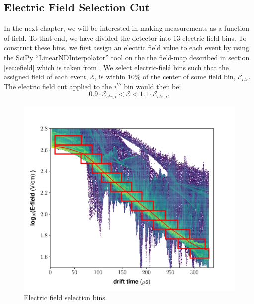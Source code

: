 {\subsection{Electric Field Selection Cut}\label{sec:fieldbins}
In the next chapter, we will be interested in making measurements as a function of field. To that end, we have divided the detector into 13 electric field bins. To construct these bins, we first assign an electric field value to each event by using the SciPy ``LinearNDInterpolator'' tool\cite{scipy} on the the field-map described in section \ref{sec:efield} which is taken from \cite{lux_efield}. We select electric-field bins such that the assigned field of each event, $\mathcal{E}$, is within 10\% of the center of some field bin, $\mathcal{E}_{ctr}$. The electric field cut applied to the  $i^{th}$ bin would then be:
\begin{equation}\label{eq:ebin_e}
0.9\cdot \mathcal{E}_{ctr,i}< \mathcal{E} < 1.1\cdot \mathcal{E}_{ctr,i}.
\end{equation}
\begin{figure}[h!]
\centering
\includegraphics[width=\textwidth]{Figures/field_cut.pdf}
\caption{Electric field selection bins. } 
\label{fig:fieldbins}
\end{figure}

}
